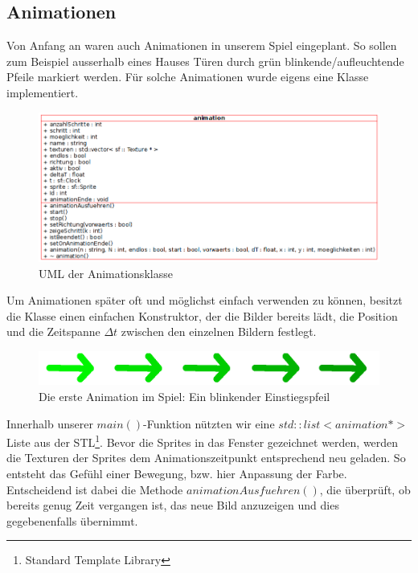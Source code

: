 \documentclass[11pt,a4paper]{scrbook}
\begin{document}
\subsection{Animationen}
Von Anfang an waren auch Animationen in unserem Spiel eingeplant. So sollen zum Beispiel ausserhalb eines Hauses
Türen durch grün blinkende/aufleuchtende Pfeile markiert werden. Für solche Animationen wurde eigens eine Klasse
implementiert.
\begin{figure}[h]
	\centering
	\includegraphics[scale=0.6]{img/animation_uml.png}
	\caption{UML der Animationsklasse}
\end{figure}
Um Animationen später oft und möglichst einfach verwenden zu können, besitzt die Klasse einen einfachen Konstruktor,
der die Bilder bereits lädt, die Position und die Zeitspanne $\Delta t$ zwischen den einzelnen Bildern festlegt.
\begin{figure}[h]
	\centering
	\includegraphics[scale=0.3]{img/animation_pfeil.png}
	\caption{Die erste Animation im Spiel: Ein blinkender Einstiegspfeil}
\end{figure}
Innerhalb unserer $main()$-Funktion nützten wir eine $std::list<animation *>$ Liste aus der STL\footnote{Standard Template Library}.
Bevor die Sprites in das Fenster gezeichnet werden, werden die Texturen der Sprites dem Animationszeitpunkt entsprechend
neu geladen. So entsteht das Gefühl einer Bewegung, bzw. hier Anpassung der Farbe. Entscheidend ist dabei die Methode
$animationAusfuehren()$, die überprüft, ob bereits genug Zeit vergangen ist, das neue Bild anzuzeigen und dies gegebenenfalls
übernimmt.
\end{document}
